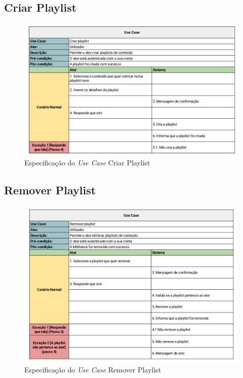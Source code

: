 \documentclass[a4paper]{report}
\begin{document}
\subsection{Criar Playlist}
\begin{figure}[H]
	\centering 
    \includegraphics[width=\textwidth]{images/Criar_Biblioteca.png}  
    \caption{Especificação do \emph{Use Case} Criar Playlist}
\end{figure}

\subsection{Remover Playlist}
\begin{figure}[H]
	\centering 
    \includegraphics[width=\textwidth]{images/Eliminar_Biblioteca.png}  
    \caption{Especificação do \emph{Use Case} Remover Playlist}
\end{figure}
\end{document}
